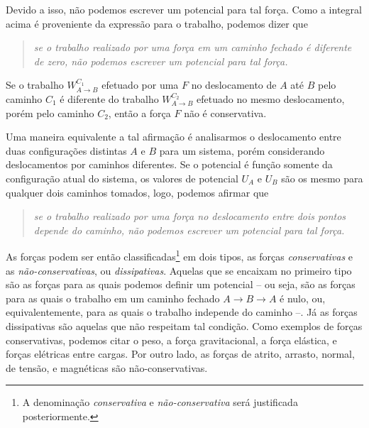 \noindent{}Devido a isso, não podemos escrever um potencial para tal força. Como a integral acima é proveniente da expressão para o trabalho, podemos dizer que
\begin{quote}
\emph{se o trabalho realizado por uma força em um caminho fechado é diferente de zero, não podemos escrever um potencial para tal força.}
\end{quote}

\begin{marginfigure}
\centering
{}
\caption{Se o trabalho $W_{A\to B}^{C_1}$ efetuado por uma $F$ no deslocamento de $A$ até $B$ pelo caminho $C_1$ é diferente do trabalho $W_{A\to B}^{C_2}$ efetuado no mesmo deslocamento, porém pelo caminho $C_2$, então a força $F$ não é conservativa.}
\end{marginfigure}

Uma maneira equivalente a tal afirmação é analisarmos o deslocamento entre duas configurações distintas $A$ e $B$ para um sistema, porém considerando deslocamentos por caminhos diferentes. Se o potencial é função somente da configuração atual do sistema, os valores de potencial $U_A$ e $U_B$ são os mesmo para qualquer dois caminhos tomados, logo, podemos afirmar que
\begin{quote}
\emph{se o trabalho realizado por uma força no deslocamento entre dois pontos depende do caminho, não podemos escrever um potencial para tal força.}
\end{quote}

As forças podem ser então classificadas\footnote{A denominação \emph{conservativa} e \emph{não-conservativa} será justificada posteriormente.} em dois tipos, as forças \emph{conservativas} e as \emph{não-conservativas}, ou \emph{dissipativas}. Aquelas que se encaixam no primeiro tipo são as forças para as quais podemos definir um potencial -- ou seja, são as forças para as quais o trabalho em um caminho fechado $A\to B\to A$ é nulo, ou, equivalentemente, para as quais o trabalho independe do caminho --. Já as forças dissipativas são aquelas que não respeitam tal condição. Como exemplos de forças conservativas, podemos citar o peso, a força gravitacional, a força elástica, e forças elétricas entre cargas. Por outro lado, as forças de atrito, arrasto, normal, de tensão, e magnéticas são não-conservativas.

